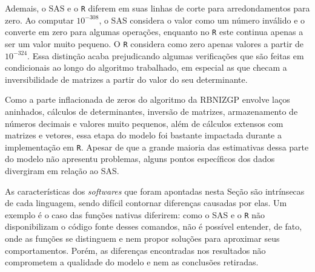 \documentclass[12pt, a4paper, twoside]{report}
\numberwithin{equation}{section} %
\begin{document}

Ademais, o SAS e o \texttt{R} diferem em suas linhas de corte para arredondamentos para zero. Ao computar $10^{-308}$, o SAS considera o valor como um número inválido e o converte em zero para algumas operações, enquanto no \texttt{R} este continua apenas a ser um valor muito pequeno. O \texttt{R} considera como zero apenas valores a partir de $10^{-324}$. Essa distinção acaba prejudicando algumas verificações que são feitas em condicionais ao longo do algoritmo trabalhado, em especial as que checam a inversibilidade de matrizes a partir do valor do seu determinante.

Como a parte inflacionada de zeros do algoritmo da RBNIZGP envolve laços aninhados, cálculos de determinantes, inversão de matrizes, armazenamento de números decimais e valores muito pequenos, além de cálculos extensos com matrizes e vetores, essa etapa do modelo foi bastante impactada durante a implementação em \texttt{R}. Apesar de que a grande maioria das estimativas dessa parte do modelo não apresentu problemas, alguns pontos específicos dos dados divergiram em relação ao SAS.


As características dos \textit{softwares} que foram apontadas nesta Seção são intrínsecas de cada linguagem, sendo difícil contornar diferenças causadas por elas. Um exemplo é o caso das funções nativas diferirem: como o SAS e o \texttt{R} não disponibilizam o código fonte desses comandos, não é possível entender, de fato, onde as funções se distinguem e nem propor soluções para aproximar seus comportamentos. Porém, as diferenças encontradas nos resultados não comprometem a qualidade do modelo e nem as conclusões retiradas.

\end{document}
